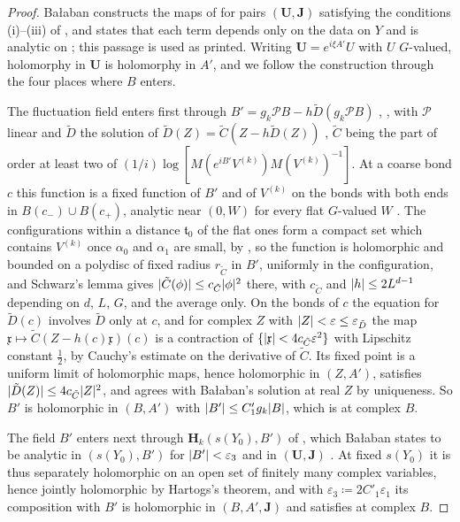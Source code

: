 \documentclass[11pt]{preprint}
\DeclarePairedDelimiter{\abs}{\lvert}{\rvert}
\numberwithin{equation}{section}
\theoremstyle{definition}
\theoremstyle{remark}
\theoremstyle{plain}
\begin{document}
\begin{proof}
Ba{\l}aban constructs the maps of \cite[pp.~3--11]{BalabanRG2} for pairs $(\mathbf U, \mathbf J)$ satisfying the conditions (i)--(iii) of \cite[p.~262, ll.~16--38]{BalabanRG1}, and states that each term depends only on the data on $Y$ and is analytic on \cite[(1.34)]{BalabanRG2} \cite[p.~7, ll.~39--42; p.~9, ll.~38--43]{BalabanRG2}; this passage is used as printed. Writing $\mathbf U = e^{i\xi A'}U$ with $U$ $G$-valued, holomorphy in $\mathbf U$ is holomorphy in $A'$, and we follow the construction through the four places where $B$ enters.

The fluctuation field enters first through $B' = g_k\mathcal PB - h\tilde D(g_k\mathcal PB)$ \cite[(1.19), p.~6]{BalabanRG2}, \cite[(3.2), p.~270]{BalabanRG1}, with $\mathcal P$ linear and $\tilde D$ the solution of $\tilde D(Z) = \tilde C(Z - h\tilde D(Z))$ \cite[p.~267, l.~26]{BalabanRG1}, $\tilde C$ being the part of order at least two of $(1/i)\log[M(e^{iB'}V^{(k)})M(V^{(k)})^{-1}]$. At a coarse bond $c$ this function is a fixed function of $B'$ and of $V^{(k)}$ on the bonds with both ends in $B(c_-) \cup B(c_+)$, analytic near $(0, W)$ for every flat $G$-valued $W$ \cite[p.~253, ll.~14--16]{BalabanRG1}. The configurations within a distance $\mathfrak t_0$ of the flat ones form a compact set which contains $V^{(k)}$ once $\alpha_0$ and $\alpha_1$ are small, by \cite[(53), p.~26; Proposition~6, p.~43]{BalabanAVG}, so the function is holomorphic and bounded on a polydisc of fixed radius $r_{\tilde C}$ in $B'$, uniformly in the configuration, and Schwarz's lemma gives $\abs{\tilde C(\phi)} \leq c_{\tilde C}\abs\phi^2$ there, with $c_{\tilde C}$ and $\abs h \leq 2L^{d-1}$ depending on $d$, $L$, $G$, and the average only. On the bonds of $c$ the equation for $\tilde D(c)$ involves $\tilde D$ only at $c$, and for complex $Z$ with $\abs Z < \varepsilon \leq \varepsilon_{\tilde D}$ the map $\mathfrak x \mapsto \tilde C(Z - h(c)\mathfrak x)(c)$ is a contraction of $\{\abs{\mathfrak x} < 4c_{\tilde C}\varepsilon^2\}$ with Lipschitz constant $\frac12$, by Cauchy's estimate on the derivative of $\tilde C$. Its fixed point is a uniform limit of holomorphic maps, hence holomorphic in $(Z, A')$, satisfies $\abs{\tilde D(Z)} \leq 4c_{\tilde C}\abs Z^2$, and agrees with Ba{\l}aban's solution at real $Z$ by uniqueness. So $B'$ is holomorphic in $(B, A')$ with $\abs{B'} \leq C'_1g_k\abs B$, which is \cite[(1.20)]{BalabanRG2} at complex $B$.

The field $B'$ enters next through $\mathbf H_k(s(Y_0), B')$ of \cite[(1.17)]{BalabanRG2}, which Ba{\l}aban states to be analytic in $(s(Y_0), B')$ for $\abs{B'} < \varepsilon_3$ \cite[p.~6, ll.~39--41]{BalabanRG2} and in $(\mathbf U, \mathbf J)$ \cite[p.~6, ll.~44--45]{BalabanRG2}. At fixed $s(Y_0)$ it is thus separately holomorphic on an open set of finitely many complex variables, hence jointly holomorphic by Hartogs's theorem, and with $\varepsilon_3 \coloneqq 2C'_1\varepsilon_1$ its composition with $B'$ is holomorphic in $(B, A', \mathbf J)$ and satisfies \cite[(1.21)]{BalabanRG2} at complex $B$.


\end{proof}
\end{document}
